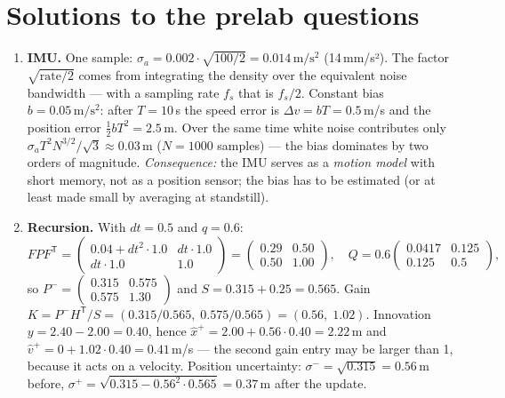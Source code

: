 \documentclass[12pt,a4paper]{scrartcl}
\begin{document}
\section{Solutions to the prelab questions}\label{sec:loesungen}
\begin{enumerate}
  \item \textbf{IMU.} One sample: \(\sigma_a=0.002\cdot\sqrt{100/2}
        = 0.014\,\mathrm{m/s^2}\) (14\,mm/s²). The factor \(\sqrt{\text{rate}/2}\) comes
        from integrating the density over the equivalent noise bandwidth — with a
        sampling rate \(f_s\) that is \(f_s/2\). Constant bias \(b=0.05\,\mathrm{m/s^2}\):
        after \(T=10\)\,s the speed error is \(\Delta v=bT=0.5\)\,m/s and the position error
        \(\tfrac{1}{2}bT^2=2.5\)\,m. Over the same time white noise contributes only
        \(\sigma_a T^2 N^{3/2}/\sqrt{3}\approx 0.03\)\,m (\(N=1000\) samples) — the bias
        dominates by two orders of magnitude. \emph{Consequence:} the IMU serves as a
        \emph{motion model} with short memory, not as a position sensor; the bias has to be
        estimated (or at least made small by averaging at standstill).
  \item \textbf{Recursion.} With \(dt=0.5\) and \(q=0.6\):
        \[
          FP F^{\mathsf T}=\begin{pmatrix}0.04+dt^2\cdot1.0 & dt\cdot1.0\\ dt\cdot1.0 & 1.0\end{pmatrix}
          =\begin{pmatrix}0.29&0.50\\0.50&1.00\end{pmatrix},\quad
          Q=0.6\begin{pmatrix}0.0417&0.125\\0.125&0.5\end{pmatrix},
        \]
        so \(P^{-}=\begin{pmatrix}0.315&0.575\\0.575&1.30\end{pmatrix}\) and
        \(S=0.315+0.25=0.565\). Gain
        \(K=P^{-}H^{\mathsf T}/S=(0.315/0.565,\;0.575/0.565)=(0.56,\;1.02)\).
        Innovation \(y=2.40-2.00=0.40\), hence
        \(\hat x^{+}=2.00+0.56\cdot0.40=2.22\)\,m and
        \(\hat v^{+}=0+1.02\cdot0.40=0.41\)\,m/s — the second gain entry may be larger
        than 1, because it acts on a velocity. Position uncertainty:
        \(\sigma^{-}=\sqrt{0.315}=0.56\,\mathrm{m}\) before,
        \(\sigma^{+}=\sqrt{0.315-0.56^2\cdot0.565}=0.37\,\mathrm{m}\) after the update.

\end{enumerate}
\end{document}
